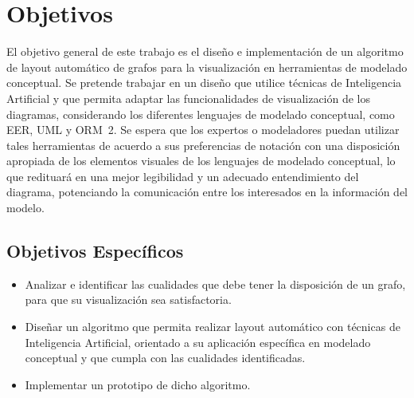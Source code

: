 \section{Objetivos}

El objetivo general de este trabajo es el diseño e implementación  de un algoritmo de layout automático de grafos para la visualización en herramientas de modelado conceptual. Se pretende trabajar en un diseño que utilice técnicas de Inteligencia Artificial y que  permita adaptar las funcionalidades de visualización de los diagramas, considerando los diferentes lenguajes de modelado conceptual, como EER, UML y \mbox{ORM 2.}
Se espera que los expertos o modeladores puedan utilizar tales herramientas de acuerdo a sus preferencias de notación con una disposición apropiada de los elementos visuales de los lenguajes de modelado conceptual, lo que redituará en una mejor legibilidad y un adecuado entendimiento del diagrama, potenciando la comunicación entre los interesados en la información del modelo.



\subsection{Objetivos Específicos}

\begin{itemize}
\item Analizar e identificar las cualidades que debe tener la disposición de un grafo, para que su visualización sea  satisfactoria.%

\item Diseñar un algoritmo que permita realizar layout automático con técnicas de Inteligencia Artificial, orientado a su aplicación específica en modelado conceptual y que cumpla con las cualidades identificadas.
\item Implementar un prototipo de dicho algoritmo.%

\end{itemize}

